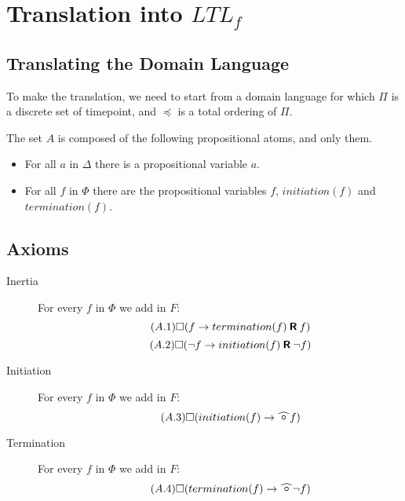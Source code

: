 \section{Translation into $LTL_f$}\label{sec:translation}

\subsection{Translating the Domain Language}\label{sec:trans_dom_ltl}

To make the translation, we need to start from a domain language for which $\Pi$ is a discrete set of timepoint, and $\preceq$ is a total ordering of $\Pi$.

The set $A$ is composed of the following propositional atoms, and only them.

\begin{itemize}
  \item For all $a$ in $\Delta$ there is a propositional variable $a$.
  \item For all $f$ in $\Phi$ there are the propositional variables $f$, $initiation(f)$ and $termination(f)$.
\end{itemize}

\subsection{Axioms}\label{sec:trans_ax_ltl}

\begin{description}
  \item[Inertia]
  For every $f$ in $\Phi$ we add in $F$:
  \begin{equation}\tag{$A.1$}
    \square(f\rightarrow termination(f) \mathbin{\bm{\mathsf{R}}} f)
  \end{equation}
  \begin{equation}\tag{$A.2$}
    \square(\neg f\rightarrow initiation(f) \mathbin{\bm{\mathsf{R}}} \neg f)
  \end{equation}
  \item[Initiation]
  For every $f$ in $\Phi$ we add in $F$:
  \begin{equation}\tag{$A.3$}
    \alwaysF(initiation(f)\rightarrow\wnext f)
  \end{equation}
  \item[Termination]
  For every $f$ in $\Phi$ we add in $F$:
  \begin{equation}\tag{$A.4$}
    \alwaysF(termination(f)\rightarrow\wnext \neg f)
  \end{equation}
\end{description}

